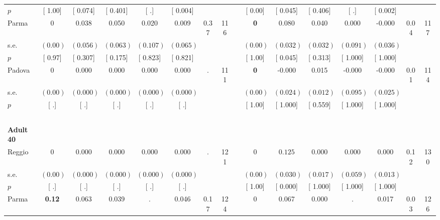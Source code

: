 \begin{longtable}{L{8em} c c c c c c c p{1em} c c c c c c c}
\quad \quad \quad \quad $ p$ & [     1.00] & [    0.074] & [    0.401] & [        .] & [    0.004] & & & & [     0.00] & [    0.045] & [    0.406] & [        .] & [    0.002] & &  \\[1em]
\quad \quad \quad Parma& 0 &     0.038 &     0.050 &     0.020 &     0.009 &      0.37 &       116 & & \textbf{0} & $ \mathbf{    0.080}$ &     0.040 &     0.000 &    -0.000 &      0.04 &       117  \\*
\quad \quad \quad \quad s.e.& $ (     0.00)$ & $ (    0.056)$ & $ (    0.063)$ & $ (    0.107)$ & $ (    0.065)$ & & & & $ (     0.00)$ & $ (    0.032)$ & $ (    0.032)$ & $ (    0.091)$ & $ (    0.036)$ & &  \\*
\quad \quad \quad \quad $ p$ & [     0.97] & [    0.307] & [    0.175] & [    0.823] & [    0.821] & & & & [     1.00] & [    0.045] & [    0.313] & [    1.000] & [    1.000] & &  \\[1em]
\quad \quad \quad Padova& 0 &     0.000 &     0.000 &     0.000 &     0.000 &         . &       111 & & \textbf{0} &    -0.000 &     0.015 &    -0.000 &    -0.000 &      0.01 &       114  \\*
\quad \quad \quad \quad s.e.& $ (     0.00)$ & $ (    0.000)$ & $ (    0.000)$ & $ (    0.000)$ & $ (    0.000)$ & & & & $ (     0.00)$ & $ (    0.024)$ & $ (    0.012)$ & $ (    0.095)$ & $ (    0.025)$ & &  \\*
\quad \quad \quad \quad $ p$ & [        .] & [        .] & [        .] & [        .] & [        .] & & & & [     1.00] & [    1.000] & [    0.559] & [    1.000] & [    1.000] & &  \\[1em]
~\\[1em]
\quad \quad \textbf{Adult 40} & & & & & & & & & & & & & & & \\* 
\quad \quad \quad Reggio& 0 &     0.000 &     0.000 &     0.000 &     0.000 &         . &       121 & & 0 & $ \mathbf{    0.125}$ &     0.000 &     0.000 &     0.000 &      0.12 &       130  \\*
\quad \quad \quad \quad s.e.& $ (     0.00)$ & $ (    0.000)$ & $ (    0.000)$ & $ (    0.000)$ & $ (    0.000)$ & & & & $ (     0.00)$ & $ (    0.030)$ & $ (    0.017)$ & $ (    0.059)$ & $ (    0.013)$ & &  \\*
\quad \quad \quad \quad $ p$ & [        .] & [        .] & [        .] & [        .] & [        .] & & & & [     1.00] & [    0.000] & [    1.000] & [    1.000] & [    1.000] & &  \\[1em]
\quad \quad \quad Parma& \textbf{     0.12} &     0.063 &     0.039 &         . &     0.046 &      0.17 &       124 & & 0 &     0.067 &     0.000 &         . &     0.017 &      0.03 &       126  \\*

\end{longtable}
